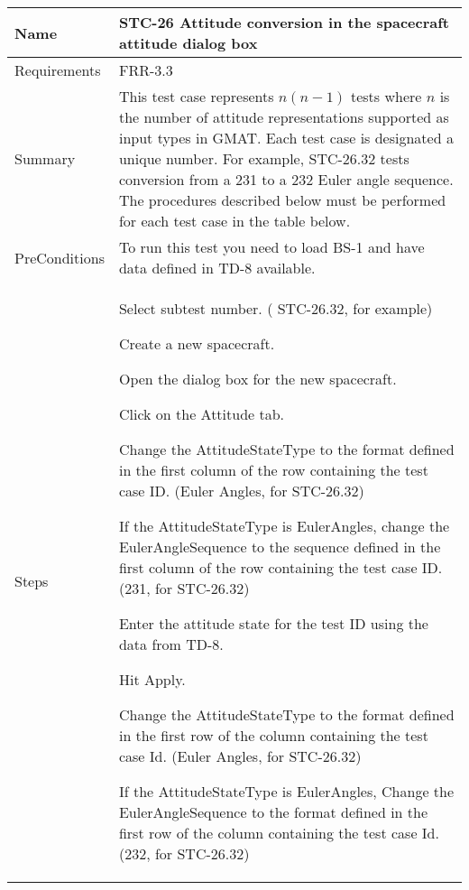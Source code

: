 \begin{table}[htbp!]
\centering
      \begin{tabular}{|p{1.0 in} |p{5.0 in} |}
         \hline
          \rowcolor[rgb]{0.8,0.8,0.8}  Name & STC-26 Attitude conversion in the spacecraft attitude dialog box\\
         \hline
         Requirements & FRR-3.3\\ \hline
         Summary & This test case represents $n(n-1)$ tests where $n$ is the number of attitude representations
         supported as input types in GMAT.  Each test case is designated a unique number.  For example,
         STC-26.32 tests conversion from a 231 to a 232 Euler angle sequence.  The procedures described below
         must be performed for each test case in the table below.   \\ \hline
         PreConditions & To run this test you need to load BS-1 and have data defined in TD-8 available.\\ \hline
         Steps &
          \begin{compactenum}
             \item Select subtest number. ( STC-26.32, for example)
             \item Create a new spacecraft.
             \item Open the dialog box for the new spacecraft.
             \item Click on the Attitude tab.
             \item Change the AttitudeStateType to the format defined in the first column of
                   the row containing the test case ID.  (Euler Angles, for STC-26.32)
             \item If the AttitudeStateType is EulerAngles, change the EulerAngleSequence to the 
                   sequence defined in the first column of
                   the row containing the test case ID.  (231, for STC-26.32)
             \item Enter the attitude state for the test ID using the data from TD-8.
             \item Hit Apply.
             \item Change the AttitudeStateType to the format defined in the first row of the column containing  the test case Id. (Euler Angles, for STC-26.32)
             \item If the AttitudeStateType is EulerAngles, Change the EulerAngleSequence to the format defined in the first row of the column containing  the test case Id. (232, for STC-26.32)

\end{compactenum}
\end{tabular}
\end{table}
